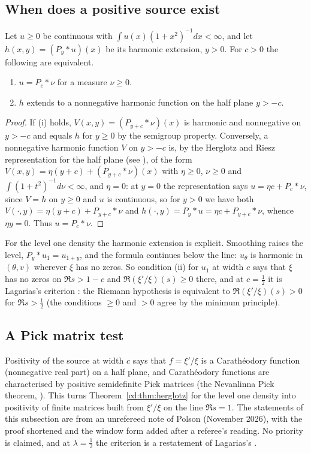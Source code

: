 \subsection{When does a positive source exist}

\begin{theorem}\label{cd:thm:herglotz}
Let $u\ge0$ be continuous with $\int u(x)(1+x^2)^{-1}dx<\infty$, and let $h(x,y)=(P_y*u)(x)$ be its harmonic extension, $y>0$. For $c>0$ the following are equivalent.
\begin{enumerate}
\item[(i)] $u=P_c*\nu$ for a measure $\nu\ge0$.
\item[(ii)] $h$ extends to a nonnegative harmonic function on the half plane $y>-c$.
\end{enumerate}
\end{theorem}

\begin{proof}
If (i) holds, $V(x,y)=(P_{y+c}*\nu)(x)$ is harmonic and nonnegative on $y>-c$ and equals $h$ for $y\ge0$ by the semigroup property. Conversely, a nonnegative harmonic function $V$ on $y>-c$ is, by the Herglotz and Riesz representation for the half plane (see \cite{ABR01}), of the form $V(x,y)=\eta(y+c)+(P_{y+c}*\nu)(x)$ with $\eta\ge0$, $\nu\ge0$ and $\int(1+t^2)^{-1}d\nu<\infty$, and $\eta=0$: at $y=0$ the representation says $u=\eta c+P_c*\nu$, since $V=h$ on $y\ge0$ and $u$ is continuous, so for $y>0$ we have both $V(\cdot,y)=\eta(y+c)+P_{y+c}*\nu$ and $h(\cdot,y)=P_y*u=\eta c+P_{y+c}*\nu$, whence $\eta y=0$. Thus $u=P_c*\nu$.
\end{proof}

For the level one density the harmonic extension is explicit. Smoothing raises the level, $P_y*u_1=u_{1+y}$, and the formula continues below the line: $u_\theta$ is harmonic in $(\theta,v)$ wherever $\xi$ has no zeros. So condition (ii) for $u_1$ at width $c$ says that $\xi$ has no zeros on $\Re s>1-c$ and $\Re(\xi'/\xi)(s)\ge0$ there, and at $c=\tfrac12$ it is Lagarias's criterion \cite{Lagarias}: the Riemann hypothesis is equivalent to $\Re(\xi'/\xi)(s)>0$ for $\Re s>\tfrac12$ (the conditions $\ge0$ and $>0$ agree by the minimum principle).


\subsection{A Pick matrix test}\label{cd:sec:pick}

Positivity of the source at width $c$ says that $f=\xi'/\xi$ is a Carath\'eodory function (nonnegative real part) on a half plane, and Carath\'eodory functions are characterised by positive semidefinite Pick matrices (the Nevanlinna Pick theorem, \cite{Donoghue74}). This turns Theorem~\ref{cd:thm:herglotz} for the level one density into positivity of finite matrices built from $\xi'/\xi$ on the line $\Re s=1$. The statements of this subsection are from an unrefereed note of Polson (November 2026), with the proof shortened and the window form added after a referee's reading. No priority is claimed, and at $\lambda=\tfrac12$ the criterion is a restatement of Lagarias's \cite{Lagarias}.

